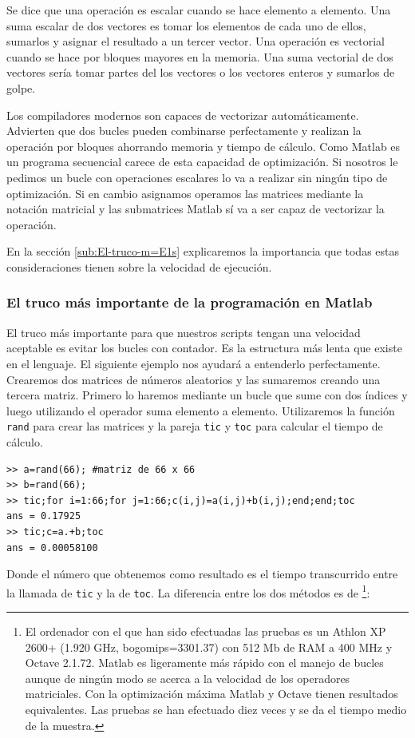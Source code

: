 Se dice que una operación es escalar cuando se hace elemento a
elemento.  Una suma escalar de dos vectores es tomar los elementos de
cada uno de ellos, sumarlos y asignar el resultado a un tercer vector.
Una operación es vectorial cuando se hace por bloques mayores en la
memoria.  Una suma vectorial de dos vectores sería tomar partes del
los vectores o los vectores enteros y sumarlos de golpe.

Los compiladores modernos son capaces de vectorizar automáticamente.
Advierten que dos bucles pueden combinarse perfectamente y realizan la
operación por bloques ahorrando memoria y tiempo de cálculo. Como
Matlab es un programa secuencial carece de esta capacidad de
optimización.  Si nosotros le pedimos un bucle con operaciones
escalares lo va a realizar sin ningún tipo de optimización. Si en
cambio asignamos operamos las matrices mediante la notación matricial
y las submatrices Matlab sí va a ser capaz de vectorizar la operación.

En la sección \ref{sub:El-truco-m=E1s} explicaremos la importancia que
todas estas consideraciones tienen sobre la velocidad de ejecución.

\subsubsection{\label{sub:El-truco-m=E1s}El truco más importante de la
  programación en Matlab}

El truco más importante para que nuestros scripts tengan una velocidad
aceptable es evitar los bucles con contador. Es la estructura más
lenta que existe en el lenguaje. El siguiente ejemplo nos ayudará a
entenderlo perfectamente. Crearemos dos matrices de números aleatorios
y las sumaremos creando una tercera matriz. Primero lo haremos
mediante un bucle que sume con dos índices y luego utilizando el
operador suma elemento a elemento. Utilizaremos la función
\texttt{rand} para crear las matrices y la pareja \texttt{tic} y
\texttt{toc} para calcular el tiempo de cálculo.

\begin{verbatim}
>> a=rand(66); #matriz de 66 x 66
>> b=rand(66);
>> tic;for i=1:66;for j=1:66;c(i,j)=a(i,j)+b(i,j);end;end;toc
ans = 0.17925
>> tic;c=a.+b;toc
ans = 0.00058100
\end{verbatim}
Donde el número que obtenemos como resultado es el tiempo transcurrido
entre la llamada de \texttt{tic} y la de \texttt{toc}. La diferencia
entre los dos métodos es de%
\footnote{El ordenador con el que han sido efectuadas las pruebas es
  un Athlon XP 2600+ (1.920 GHz, bogomips=3301.37) con 512 Mb de RAM a
  400 MHz y Octave 2.1.72. Matlab es ligeramente más rápido con el
  manejo de bucles aunque de ningún modo se acerca a la velocidad de
  los operadores matriciales. Con la optimización máxima Matlab y
  Octave tienen resultados equivalentes. Las pruebas se han efectuado
  diez veces y se da el tiempo medio de la muestra.%
}:

